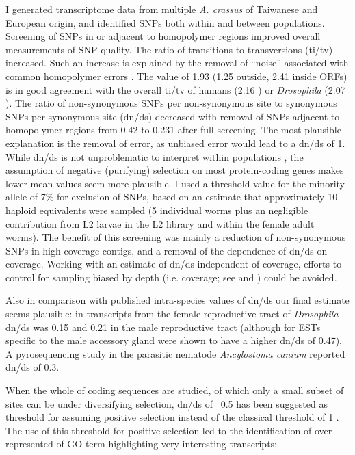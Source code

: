 I generated transcriptome data from multiple \textit{A. crassus} of
Taiwanese and European origin, and identified SNPs both within and
between populations. Screening of SNPs in or adjacent to homopolymer
regions improved overall measurements of SNP quality. The ratio of
transitions to transversions (ti/tv) increased. Such an increase is
explained by the removal of ``noise'' associated with common homopolymer
errors \cite{pmid21685085}. The value of 1.93 (1.25 outside, 2.41
inside ORFs) is in good agreement with the overall ti/tv of humans
(2.16 \cite{pmid21169219}) or \textit{Drosophila} (2.07
\cite{pmid21143862}). The ratio of non-synonymous SNPs per
non-synonymous site to synonymous SNPs per synonymous site (dn/ds)
decreased with removal of SNPs adjacent to homopolymer regions from
0.42 to 0.231 after full screening. The most plausible explanation is
the removal of error, as unbiased error would lead to a dn/ds of
1. While dn/ds is not unproblematic to interpret within populations
\cite{pmid19081788}, the assumption of negative (purifying) selection
on most protein-coding genes makes lower mean values seem more
plausible. I used a threshold value for the minority allele of 7\%
for exclusion of SNPs, based on an estimate that approximately 10
haploid equivalents were sampled (5 individual worms plus an
negligible contribution from L2 larvae in the L2 library and within
the female adult worms). The benefit of this screening was mainly a
reduction of non-synonymous SNPs in high coverage contigs, and a
removal of the dependence of dn/ds on coverage. Working with an
estimate of dn/ds independent of coverage, efforts to control for
sampling biased by depth (i.e. coverage; see \cite{pmid18590545} and
\cite{pmid20478048}) could be avoided.

Also in comparison with published intra-species values of dn/ds our
final estimate seems plausible: in transcripts from the female
reproductive tract of \textit{Drosophila} dn/ds was 0.15
\cite{pmid15579698} and 0.21 in the male reproductive tract
\cite{pmid11404480} (although for ESTs specific to the male accessory
gland were shown to have a higher dn/ds of 0.47). A pyrosequencing
study in the parasitic nematode \textit{Ancylostoma canium}
\cite{pmid20470405} reported dn/ds of 0.3.

When the whole of coding sequences are studied, of which only a small
subset of sites can be under diversifying selection, dn/ds of ~0.5 has
been suggested as threshold for assuming positive selection
\cite{pmid15579698} instead of the classical threshold of 1
\cite{pmid6449605}. The use of this threshold for positive selection
led to the identification of over-represented of GO-term highlighting
very interesting transcripts:

